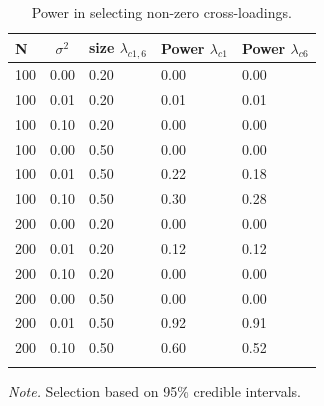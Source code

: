 \documentclass[
  man, donotrepeattitle,floatsintext]{apa6}
\begin{document}
\begin{appendix}
\section{}
\begin{table}[H]

\begin{center}
\begin{threeparttable}

\caption{\label{tab:unnamed-chunk-10}Power in selecting non-zero cross-loadings.}

\begin{tabular}{lllll}
\toprule
N & \multicolumn{1}{c}{$\sigma^2$} & \multicolumn{1}{c}{size $\lambda_{c1 , 6}$} & \multicolumn{1}{c}{Power $\lambda_{c1}$} & \multicolumn{1}{c}{Power $\lambda_{c6}$}\\
\midrule
100 & 0.00 & 0.20 & 0.00 & 0.00\\
100 & 0.01 & 0.20 & 0.01 & 0.01\\
100 & 0.10 & 0.20 & 0.00 & 0.00\\
100 & 0.00 & 0.50 & 0.00 & 0.00\\
100 & 0.01 & 0.50 & 0.22 & 0.18\\
100 & 0.10 & 0.50 & 0.30 & 0.28\\
200 & 0.00 & 0.20 & 0.00 & 0.00\\
200 & 0.01 & 0.20 & 0.12 & 0.12\\
200 & 0.10 & 0.20 & 0.00 & 0.00\\
200 & 0.00 & 0.50 & 0.00 & 0.00\\
200 & 0.01 & 0.50 & 0.92 & 0.91\\
200 & 0.10 & 0.50 & 0.60 & 0.52\\
\bottomrule
\addlinespace
\end{tabular}

\begin{tablenotes}[para]
\normalsize{\textit{Note.} Selection based on 95\% credible intervals.}
\end{tablenotes}

\end{threeparttable}
\end{center}

\end{table}
\end{appendix}
\end{document}
